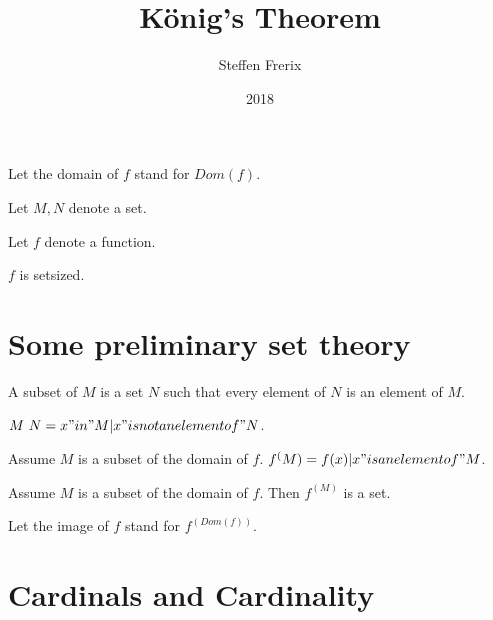 \documentclass{article}
\title{König's Theorem}
\author{Steffen Frerix}
\date{2018}
\begin{document}

  \maketitle

  \begin{forthel}

    Let the domain of $f$ stand for $Dom(f)$.

    Let $M,N$ denote a set.

    Let $f$ denote a function.
    \begin{axiom}
      $f$ is setsized.
    \end{axiom}
  \end{forthel}


  \section*{Some preliminary set theory}

  \begin{forthel}
    \begin{definition}
      A subset of $M$ is a set $N$ such that every element of $N$ is an element of $M$.
    \end{definition}

    \begin{definition}
      $M \ N = {x "in" M | x "is not an element of" N}$.
    \end{definition}

    \begin{definition}
      Assume $M$ is a subset of the domain of $f$. $f^(M) = {f(x) | x "is an element of" M}$.
    \end{definition}

    \begin{axiom}
      Assume $M$ is a subset of the domain of $f$. Then $f^(M)$ is a set.
    \end{axiom}

    Let the image of $f$ stand for $f^(Dom(f))$.
  \end{forthel}


  \section*{Cardinals and Cardinality}
\end{document}
